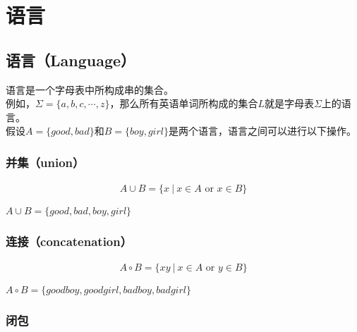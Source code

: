 \newpage

\section{语言}

\subsection{语言（Language）}

语言是一个字母表中所构成串的集合。\\

例如，$ \Sigma = \{a, b, c, \cdots, z\} $，那么所有英语单词所构成的集合$ L $就是字母表$ \Sigma $上的语言。\\

假设$ A = \{good, bad\} $和$ B = \{boy, girl\} $是两个语言，语言之间可以进行以下操作。\\

\subsubsection{并集（union）}

\vspace{-1cm}

\begin{align}
	A \cup B = \{x\ |\ x \in A \text{ or } x \in B\}
\end{align}

$ A \cup B = \{good, bad, boy, girl\} $\\

\subsubsection{连接（concatenation）}

\vspace{-1cm}

\begin{align}
	A \circ B = \{xy\ |\ x \in A \text{ or } y \in B\}
\end{align}

$ A \circ B = \{goodboy, goodgirl, badboy, badgirl\} $\\

\subsubsection{闭包}

\vspace{-1cm}

